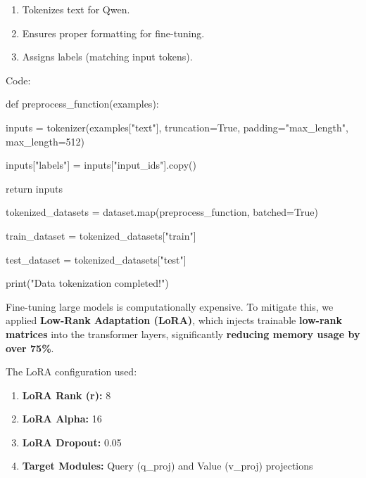 \documentclass{article} %
\begin{document}
\begin{enumerate}
\item  Tokenizes text for Qwen.

\item  Ensures proper formatting for fine-tuning.

\item  Assigns labels (matching input tokens).
\end{enumerate}

\noindent \begin{flushleft}
Code:

\noindent def preprocess\_function(examples):

\noindent     inputs = tokenizer(examples["text"], truncation=True, padding="max\_length", max\_length=512)

\noindent     inputs["labels"] = inputs["input\_ids"].copy()

\noindent     return inputs

\noindent tokenized\_datasets = dataset.map(preprocess\_function, batched=True)

\noindent train\_dataset = tokenized\_datasets["train"]

\noindent test\_dataset = tokenized\_datasets["test"]

\noindent print("Data tokenization completed!")

\noindent 
\newline

\noindent \textbf{}
\newline

\noindent Fine-tuning large models is computationally expensive. To mitigate this, we applied \textbf{Low-Rank Adaptation (LoRA)}, which injects trainable \textbf{low-rank matrices} into the transformer layers, significantly \textbf{reducing memory usage by over 75\%}.

\noindent The LoRA configuration used:
\end{flushleft}

\begin{enumerate}
\item  \textbf{LoRA Rank (r):} 8

\item  \textbf{LoRA Alpha:} 16

\item  \textbf{LoRA Dropout:} 0.05

\item  \textbf{Target Modules:} Query (q\_proj) and Value (v\_proj) projections
\end{enumerate}
\end{document}
